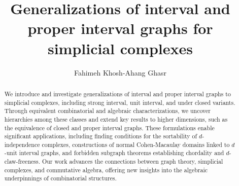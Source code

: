 \documentclass[12pt,reqno]{amsart}
\theoremstyle{plain}
\theoremstyle{definition}
\numberwithin{equation}{section}
\begin{document}
\title[Generalizations of interval and proper interval graphs]{Generalizations of interval and proper interval graphs for simplicial complexes}

\author[F. Khosh-Ahang]{Fahimeh Khosh-Ahang Ghasr}
\address{{Department of Mathematics, Ilam University,
P.O.Box 69315-516, Ilam, Iran.}}

\begin{abstract}
We introduce and investigate generalizations of interval and proper interval graphs to simplicial complexes, including strong interval, unit interval, and under closed variants. Through equivalent combinatorial and algebraic characterizations, we uncover hierarchies among these classes and extend key results to higher dimensions, such as the equivalence of closed and proper interval graphs. These formulations enable significant applications, including finding conditions for the sortability of $d$-independence complexes, constructions of normal Cohen-Macaulay domains linked to $d$-unit interval graphs, and forbidden subgraph theorems establishing chordality and $d$-claw-freeness. Our work advances the connections between graph theory, simplicial complexes, and commutative algebra, offering new insights into the algebraic underpinnings of combinatorial structures.
\end{abstract}






\end{document}
